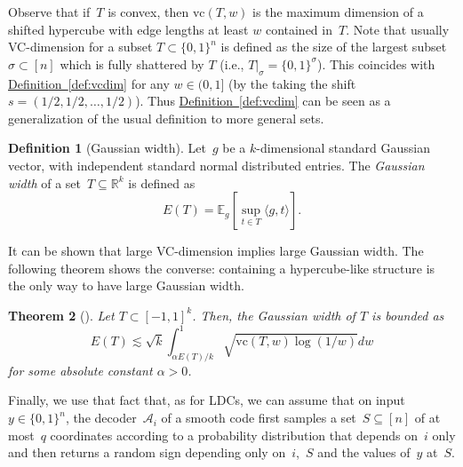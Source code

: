 \documentclass[11pt]{article}
\numberwithin{equation}{section}
\newtheorem{theorem}{Theorem}[section]
\theoremstyle{definition}
\newtheorem{definition}[theorem]{Definition}
\theoremstyle{plain}
\newcommand{\R}{\mathbb R}
\newcommand{\expref}[2]{\hyperref[#2]{#1~\ref{#2}}}
\newcommand{\bset}[1]{\{0,1\}^{#1}} %
\newcommand{\E}{\mathbb{E}}
\newcommand{\vc}{{\mathrm{vc}}}
\newcommand{\inpro}[2]{\langle #1,#2 \rangle}
\newcommand{\beqn}{\begin{equation*}}
\newcommand{\eeqn}{\end{equation*}}
\begin{document}
Observe that if~$T$ is convex, then $\vc(T,w)$ is the maximum dimension of a shifted hypercube with edge lengths at least $w$ contained in~$T$. Note that usually VC-dimension for a subset $T\subset \{0,1\}^n$ is defined as the size of the largest subset $\sigma\subset [n]$ which is fully shattered by $T$ (i.e., $T|_\sigma=\{0,1\}^\sigma$). This coincides with \expref{Definition}{def:vcdim} for any $w\in (0,1]$ (by the taking the shift $s=(1/2,1/2,\dots,1/2)$). Thus \expref{Definition}{def:vcdim} can be seen as a generalization of the usual definition to more general sets.

\begin{definition}[Gaussian width]
Let~$g$ be a $k$-dimensional standard Gaussian vector, with independent standard normal distributed entries.
The \emph{Gaussian width} of a set~$T\subseteq \R^k$ is defined as
\beqn
E(T)=\E_g[\sup_{t\in T} \inpro{g}{t}].
\eeqn
\end{definition}

It can be shown that large VC-dimension implies large Gaussian width.
The following theorem shows the converse: containing a hypercube-like structure is the only way to have large Gaussian width.


\begin{theorem}[\cite{Mendelson:2003}]\label{thm:vcdim}
Let $T\subset [-1,1]^k$. Then, the Gaussian width of $T$ is bounded as
$$E(T) \lesssim \sqrt{k} \int_{\alpha E(T)/k}^1 \sqrt{\vc(T,w) \log (1/w)} dw$$ for some absolute constant $\alpha >0$.
\end{theorem}


Finally, we use that fact that, as for LDCs, we can assume that on input~$y\in\bset{n}$, the decoder~$\mathcal A_i$ of a smooth code first samples a set~$S\subseteq[n]$ of at most~$q$ coordinates according to a probability distribution that depends on~$i$ only and then returns a random sign depending only on~$i$,~$S$ and the values of~$y$ at~$S$.
\end{document}
